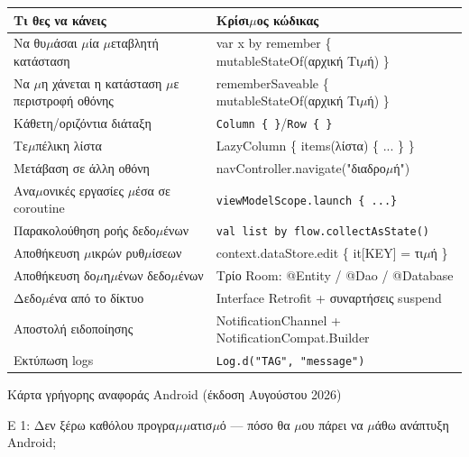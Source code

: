 


\begin{center}
\begin{tabularx}{\linewidth}{|X|X|}
\hline
\textbf{Τι θες να κάνεις} & \textbf{Κρίσι$\mu$ος κώδικας} \tabularnewline
\hline
Να θυ$\mu$άσαι $\mu$ία $\mu$εταβλητή κατάσταση & var x by remember \{ mutableStateOf(αρχική Τι$\mu$ή) \} \tabularnewline
Να $\mu$η χάνεται η κατάσταση $\mu$ε περιστροφή οθόνης & rememberSaveable \{ mutableStateOf(αρχική Τι$\mu$ή) \} \tabularnewline
Κάθετη/οριζόντια διάταξη & \texttt{Column \{ \}}/\texttt{Row \{ \}} \tabularnewline
Τε$\mu$πέλικη λίστα & LazyColumn \{ items(λίστα) \{ ... \} \} \tabularnewline
Μετάβαση σε άλλη οθόνη & navController.navigate("διαδρο$\mu$ή") \tabularnewline
Ανα$\mu$ονικές εργασίες $\mu$έσα σε coroutine & \texttt{viewModelScope.\allowbreak launch \{ .\allowbreak .\allowbreak .\allowbreak  \}} \tabularnewline
Παρακολούθηση ροής δεδο$\mu$ένων & \texttt{val list by flow.\allowbreak collectAsState()} \tabularnewline
Αποθήκευση $\mu$ικρών ρυθ$\mu$ίσεων & context.dataStore.edit \{ it[KEY] = τι$\mu$ή \} \tabularnewline
Αποθήκευση δο$\mu$η$\mu$ένων δεδο$\mu$ένων & Τρίο Room: @Entity / @Dao / @Database \tabularnewline
Δεδο$\mu$ένα από το δίκτυο & Interface Retrofit + συναρτήσεις suspend \tabularnewline
Αποστολή ειδοποίησης & NotificationChannel + NotificationCompat.Builder \tabularnewline
Εκτύπωση logs & \texttt{Log.\allowbreak d("TAG", "message")} \tabularnewline
\hline
\end{tabularx}
\end{center}

\begin{center}\small\color{gray}Κάρτα γρήγορης αναφοράς Android (έκδοση Αυγούστου 2026)\end{center}


Ε 1: Δεν ξέρω καθόλου προγρα$\mu$$\mu$ατισ$\mu$ό — πόσο θα $\mu$ου πάρει να $\mu$άθω ανάπτυξη Android;

